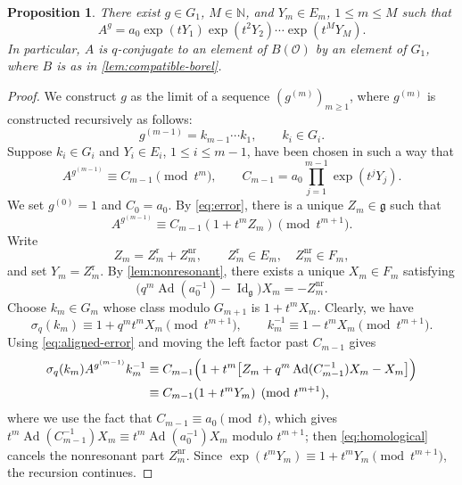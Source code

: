 \documentclass[11pt]{amsart}
\numberwithin{equation}{section}
\newtheorem{proposition}[proposition]{Proposition}
\theoremstyle{definition}
\theoremstyle{remark}
\begin{document}
\begin{proposition}\label{prop:aligned}
There exist $g\in G_1$, $M\in\mathbb{N}$, and $Y_m\in E_m$, $1\leq m\leq M$
such that
\begin{equation}\label{eq:aligned}
  A^{g}
  =a_0\exp(tY_1)\exp(t^2Y_2)\cdots\exp(t^MY_M).
\end{equation}
In particular, $A$ is $q$-conjugate to an element of $B(\mathcal{O})$ by an element of $G_1$, where $B$ is as in \cref{lem:compatible-borel}.
\end{proposition}

\begin{proof}
We construct $g$ as the limit of a sequence $(g^{(m)})_{m\geq 1}$, where $g^{(m)}$ is constructed recursively as follows:
\[
  g^{(m-1)}=k_{m-1}\cdots k_1, \qquad k_{i}\in G_i.
\]
Suppose $k_{i}\in G_i$ and $Y_{i}\in E_i$, $1\leq i\leq m-1$, have been chosen in such a way that
\[
  A^{g^{(m-1)}}\equiv C_{m-1}\pmod{t^m},
  \qquad
  C_{m-1}=a_0\prod_{j=1}^{m-1}\exp(t^jY_j).
\]
We set $g^{(0)}=1$ and $C_0=a_0$. By
\eqref{eq:error}, there is a unique $Z_m\in\mathfrak{g}$ such that
\begin{equation}\label{eq:aligned-error}
  A^{g^{(m-1)}}
  \equiv C_{m-1}(1+t^mZ_m)\pmod{t^{m+1}}.
\end{equation}
Write
\[
  Z_m=Z_m^{\mathrm{r}}+Z_m^{\mathrm{nr}},
  \qquad
  Z_m^{\mathrm{r}}\in E_m,
  \quad Z_m^{\mathrm{nr}}\in F_m,
\]
and set $Y_m=Z_m^{\mathrm{r}}$. By \cref{lem:nonresonant}, there exists a
unique $X_m\in F_m$ satisfying
\begin{equation}\label{eq:homological}
  \bigl(q^m\operatorname{Ad}(a_0^{-1})-
  \operatorname{Id}_{\mathfrak g}\bigr)X_m=-Z_m^{\mathrm{nr}}.
\end{equation}
Choose $k_m\in G_m$ whose class modulo $G_{m+1}$ is $1+t^mX_m$. Clearly, we have 
\[
  \sigma_q(k_m)\equiv1+q^mt^mX_m \pmod{t^{m+1}},
  \qquad
  k_m^{-1}\equiv1-t^mX_m \pmod{t^{m+1}}.
\]
Using \eqref{eq:aligned-error} and moving the left factor past
$C_{m-1}$ gives
\begin{align*}
  \sigma_q(k_m)A^{g^{(m-1)}}k_m^{-1}
  &\equiv C_{m-1}\Bigl(1+t^m\bigl[Z_m
       +q^m\operatorname{Ad}(C_{m-1}^{-1})X_m-X_m\bigr]\Bigr)\\
  &\equiv C_{m-1}(1+t^mY_m)
  \pmod{t^{m+1}},
\end{align*}
where we use the fact that $C_{m-1}\equiv a_0\pmod{t}$, which gives 
$t^m\operatorname{Ad}(C_{m-1}^{-1})X_m\equiv
t^m\operatorname{Ad}(a_0^{-1})X_m$ modulo $t^{m+1}$; then
\eqref{eq:homological} cancels the nonresonant part $Z_m^{\mathrm{nr}}$.  Since
$\exp(t^mY_m)\equiv1+t^mY_m\pmod{t^{m+1}}$, the recursion continues.


\end{proof}
\end{document}
